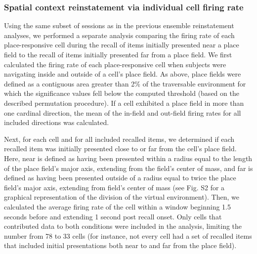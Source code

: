 \subsubsection*{Spatial context reinstatement via individual cell firing rate}
Using the same subset of sessions as in the previous ensemble reinstatement analyses, we performed a separate analysis comparing the firing rate of each place-responsive cell during the recall of items initially presented near a place field to the recall of items initially presented far from a place field.  We first calculated the firing rate of each place-responsive cell when subjects were navigating inside and outside of a cell's place field. As above, place fields were defined as a contiguous area greater than 2\% of the traversable environment for which the significance values fell below the computed threshold (based on the described permutation procedure).  If a cell exhibited a place field in more than one cardinal direction, the mean of the in-field and out-field firing rates for all included directions was calculated.

Next, for each cell and for all included recalled items, we determined if each recalled item was initially presented close to or far from the cell's place field. Here, near is defined as having been presented within a radius equal to the length of the place field's major axis, extending from the field's center of mass, and far is defined as having been presented outside of a radius equal to twice the place field's major axis, extending from field's center of mass (see Fig. S2 for a graphical representation of the division of the virtual environment). Then, we calculated the average firing rate of the cell within a window beginning 1.5 seconds before and extending 1 second post recall onset. Only cells that contributed data to both conditions were included in the analysis, limiting the number from 78 to 33 cells (for instance, not every cell had a set of recalled items that included initial presentations both near to and far from the place field).

